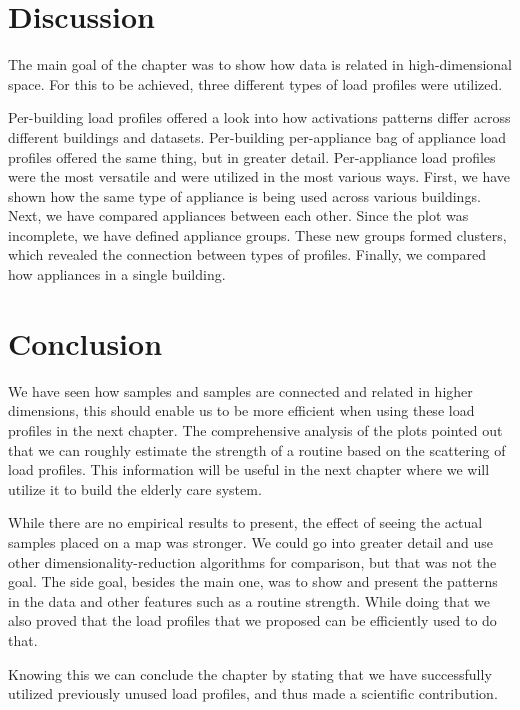 \section{Discussion}

The main goal of the chapter was to show how data is related in high-dimensional space.
For this to be achieved, three different types of load profiles were utilized. 

Per-building load profiles offered a look into how activations patterns differ across different buildings and datasets.
Per-building per-appliance bag of appliance load profiles offered the same thing, but in greater detail.
Per-appliance load profiles were the most versatile and were utilized in the most various ways.
First, we have shown how the same type of appliance is being used across various buildings.
Next, we have compared appliances between each other. 
Since the plot was incomplete, we have defined appliance groups.
These new groups formed clusters, which revealed the connection between types of profiles. 
Finally, we compared how appliances in a single building. 

\section{Conclusion}

We have seen how samples and samples are connected and related in higher dimensions, this should enable us to be more efficient when using these load profiles in the next chapter. 
The comprehensive analysis of the plots pointed out that we can roughly estimate the strength of a routine based on the scattering of load profiles.
This information will be useful in the next chapter where we will utilize it to build the elderly care system.

While there are no empirical results to present, the effect of seeing the actual samples placed on a map was stronger.
We could go into greater detail and use other dimensionality-reduction algorithms for comparison, but that was not the goal.
The side goal, besides the main one, was to show and present the patterns in the data and other features such as a routine strength.
While doing that we also proved that the load profiles that we proposed can be efficiently used to do that.

Knowing this we can conclude the chapter by stating that we have successfully utilized previously unused load profiles, and thus made a scientific contribution.
